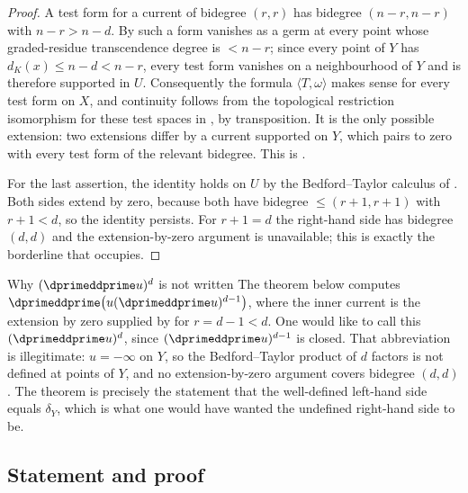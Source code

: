 \begin{proof}
A test form for a current of bidegree $(r,r)$ has bidegree $(n-r,n-r)$ with
$n-r>n-d$.  By \cite[Proposition~15.2.1]{CLD25} such a form vanishes as a
germ at every point whose graded-residue transcendence degree is $<n-r$; since every
point of $Y$ has $d_K(x)\le n-d<n-r$, every test form vanishes on a
neighbourhood of $Y$ and is therefore supported in $U$.  Consequently the
formula $\langle T,\omega\rangle$ makes sense for every test form on $X$, and
continuity follows from the topological restriction isomorphism for these
test spaces in \cite[Lemma~7.1.13]{CLD25}, by transposition.  It is the only
possible extension: two extensions differ by a current
supported on $Y$, which pairs to zero with every test form of the relevant
bidegree.  This is \cite[Lemma~7.1.13]{CLD25}.

For the last assertion, the identity holds on $U$ by the Bedford--Taylor
calculus of .  Both sides extend by zero,
because both have bidegree $\le(r+1,r+1)$ with $r+1<d$, so the identity
persists.  For $r+1=d$ the right-hand side has bidegree $(d,d)$ and the
extension-by-zero argument is unavailable; this is exactly the borderline
that  occupies.
\end{proof}

\begin{warning}{Why $(\dprimeddprime u)^d$ is not written}
The theorem below computes
$\dprimeddprime\bigl(u(\dprimeddprime u)^{d-1}\bigr)$, where the inner
current is the extension by zero supplied by  for
$r=d-1<d$.  One would like to call this $(\dprimeddprime u)^d$, since
$(\dprimeddprime u)^{d-1}$ is closed.  That abbreviation is illegitimate:
$u=-\infty$ on $Y$, so the Bedford--Taylor product of $d$ factors is not
defined at points of $Y$, and no extension-by-zero argument covers bidegree
$(d,d)$.  The theorem is precisely the statement that the well-defined
left-hand side equals $\delta_Y$, which is what one would have wanted the
undefined right-hand side to be.
\end{warning}

\subsection{Statement and proof}


